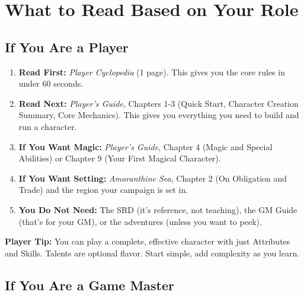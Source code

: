 \documentclass[10pt]{article}
\begin{document}
\newpage

\section*{What to Read Based on Your Role}

\subsection*{If You Are a Player}

\begin{enumerate}
\item \textbf{Read First:} \textit{Player Cyclopedia} (1 page). This gives you the core rules in under 60 seconds.
\item \textbf{Read Next:} \textit{Player's Guide}, Chapters 1-3 (Quick Start, Character Creation Summary, Core Mechanics). This gives you everything you need to build and run a character.
\item \textbf{If You Want Magic:} \textit{Player's Guide}, Chapter 4 (Magic and Special Abilities) or Chapter 9 (Your First Magical Character).
\item \textbf{If You Want Setting:} \textit{Amaranthine Sea}, Chapter 2 (On Obligation and Trade) and the region your campaign is set in.
\item \textbf{You Do Not Need:} The SRD (it's reference, not teaching), the GM Guide (that's for your GM), or the adventures (unless you want to peek).
\end{enumerate}

\begin{tipbox}
\textbf{Player Tip:} You can play a complete, effective character with just Attributes and Skills. Talents are optional flavor. Start simple, add complexity as you learn.
\end{tipbox}

\subsection*{If You Are a Game Master}
\end{document}
